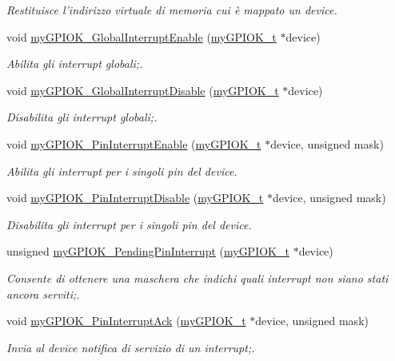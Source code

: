 \begin{DoxyCompactItemize}
\begin{DoxyCompactList}\small\item\em Restituisce l'indirizzo virtuale di memoria cui è mappato un device. \end{DoxyCompactList}\item 
void \hyperlink{group___linux-_driver_gaf8da20aabceb02b9ea8132228c973368}{my\+G\+P\+I\+O\+K\+\_\+\+Global\+Interrupt\+Enable} (\hyperlink{structmy_g_p_i_o_k__t}{my\+G\+P\+I\+O\+K\+\_\+t} $\ast$device)
\begin{DoxyCompactList}\small\item\em Abilita gli interrupt globali;. \end{DoxyCompactList}\item 
void \hyperlink{group___linux-_driver_gad9275880dc4941d3d0ae93c45bf4cf79}{my\+G\+P\+I\+O\+K\+\_\+\+Global\+Interrupt\+Disable} (\hyperlink{structmy_g_p_i_o_k__t}{my\+G\+P\+I\+O\+K\+\_\+t} $\ast$device)
\begin{DoxyCompactList}\small\item\em Disabilita gli interrupt globali;. \end{DoxyCompactList}\item 
void \hyperlink{group___linux-_driver_gac63adbb81dcfa905341a9ea0bc6283b6}{my\+G\+P\+I\+O\+K\+\_\+\+Pin\+Interrupt\+Enable} (\hyperlink{structmy_g_p_i_o_k__t}{my\+G\+P\+I\+O\+K\+\_\+t} $\ast$device, unsigned mask)
\begin{DoxyCompactList}\small\item\em Abilita gli interrupt per i singoli pin del device. \end{DoxyCompactList}\item 
void \hyperlink{group___linux-_driver_gad600864a578b08a526f8955d3e9f6ca0}{my\+G\+P\+I\+O\+K\+\_\+\+Pin\+Interrupt\+Disable} (\hyperlink{structmy_g_p_i_o_k__t}{my\+G\+P\+I\+O\+K\+\_\+t} $\ast$device, unsigned mask)
\begin{DoxyCompactList}\small\item\em Disabilita gli interrupt per i singoli pin del device. \end{DoxyCompactList}\item 
unsigned \hyperlink{group___linux-_driver_ga3c78c03314722cfa7f32503ede4c29c4}{my\+G\+P\+I\+O\+K\+\_\+\+Pending\+Pin\+Interrupt} (\hyperlink{structmy_g_p_i_o_k__t}{my\+G\+P\+I\+O\+K\+\_\+t} $\ast$device)
\begin{DoxyCompactList}\small\item\em Consente di ottenere una maschera che indichi quali interrupt non siano stati ancora serviti;. \end{DoxyCompactList}\item 
void \hyperlink{group___linux-_driver_ga3c0591dacf65607a7e31a0bf9c9011ae}{my\+G\+P\+I\+O\+K\+\_\+\+Pin\+Interrupt\+Ack} (\hyperlink{structmy_g_p_i_o_k__t}{my\+G\+P\+I\+O\+K\+\_\+t} $\ast$device, unsigned mask)
\begin{DoxyCompactList}\small\item\em Invia al device notifica di servizio di un interrupt;. \end{DoxyCompactList}\end{DoxyCompactItemize}
